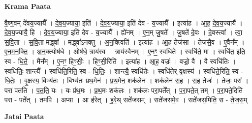 \documentclass[17pt]{extarticle}
\begin{document}
\textbf{Krama Paata} \newline

वै॒ष्ण॒वम् दे॑वय॒ज्यायै᳚ । दे॒व॒य॒ज्याया॒ इति॑ । दे॒व॒य॒ज्याया॒ इति॑ देव - य॒ज्यायै᳚ । इत्या॑ह । आ॒ह॒ दे॒व॒य॒ज्यायै᳚ । दे॒व॒य॒ज्यायै॒ हि । दे॒व॒य॒ज्याया॒ इति॑ देव - य॒ज्यायै᳚ । ह्ये॑नम् । ए॒न॒म् जु॒षते᳚ । जु॒षते॑ दे॒वः । दे॒वस्त्वा᳚ । त्वा॒ स॒वि॒ता । स॒वि॒ता मद्ध्वा᳚ । मद्ध्वा॑ऽनक्तु । अ॒न॒क्त्विति॑ । इत्या॑ह । आ॒ह॒ तेज॑सा । तेज॑सै॒व । ए॒वैन᳚म् । ए॒न॒म॒न॒क्ति॒ । अ॒न॒क्त्योष॑धे । ओष॑धे॒ त्राय॑स्व । त्राय॑स्वैनम् । ए॒नꣳ॒॒ स्वधि॑ते । स्वधि॑ते॒ मा । स्वधि॑त॒ इति॒ स्व - धि॒ते॒ । मैन᳚म् । ए॒नꣳ॒॒ हिꣳ॒॒सीः॒ । हिꣳ॒॒सी॒रिति॑ । इत्या॑ह । आ॒ह॒ वज्रः॑ । वज्रो॒ वै । वै स्वधि॑तिः । स्वधि॑तिः॒ शान्त्यै᳚ । स्वधि॑ति॒रिति॒ स्व - धि॒तिः॒ । शान्त्यै॒ स्वधि॑तेः । स्वधि॑तेर् वृ॒क्षस्य॑ । स्वधि॑ते॒रिति॒ स्व - धि॒तेः॒ । वृ॒क्षस्य॒ बिभ्य॑तः । बिभ्य॑तः प्रथ॒मेन॑ । प्र॒थ॒मेन॒ शक॑लेन । शक॑लेन स॒ह । स॒ह तेजः॑ । तेजः॒ परा᳚ । परा॑ पतति । प॒त॒ति॒ यः । यः प्र॑थ॒मः । प्र॒थ॒मः शक॑लः । शक॑लः परा॒पते᳚त् । प॒रा॒पते॒त् तम् । प॒रा॒पते॒दिति॑ परा - पते᳚त् । तमपि॑ । अप्या । आ ह॑रेत् । ह॒रे॒थ् सते॑जसम् । सते॑जसमे॒व । सते॑जस॒मिति॒ स - ते॒ज॒स॒म् \newline

\textbf{Jatai Paata} \newline
\end{document}
